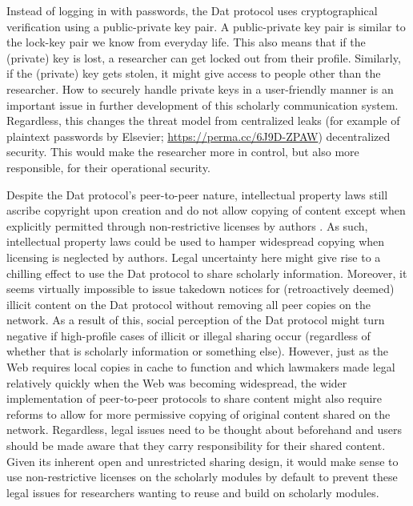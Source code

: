 \documentclass[publications,article,submit,moreauthors,pdftex,10pt,a4paper]{Definitions/mdpi}
\begin{document}
Instead of logging in with passwords, the Dat protocol uses
cryptographical verification using a public-private key pair. A
public-private key pair is similar to the lock-key pair we know from
everyday life. This also means that if the (private) key is lost, a
researcher can get locked out from their profile. Similarly, if the
(private) key gets stolen, it might give access to people other than
the researcher. How to securely handle private keys in a user-friendly
manner is an important issue in further development of this scholarly
communication system. Regardless, this changes the threat model from
centralized leaks (for example of plaintext passwords by Elsevier;
\url{https://perma.cc/6J9D-ZPAW}) decentralized security. This
would make the researcher more in control, but also more responsible,
for their operational security.

Despite the Dat protocol's peer-to-peer nature, intellectual property
laws still ascribe copyright upon creation and do not allow copying of
content except when explicitly permitted through non-restrictive
licenses by authors \citep{isbn:9781400851911}. As such, intellectual
property laws could be used to hamper widespread copying when
licensing is neglected by authors. Legal uncertainty here might give
rise to a chilling effect to use the Dat protocol to share scholarly
information. Moreover, it seems virtually impossible to issue takedown
notices for (retroactively deemed) illicit content on the Dat protocol
without removing all peer copies on the network. As a result of this,
social perception of the Dat protocol might turn negative if
high-profile cases of illicit or illegal sharing occur (regardless of
whether that is scholarly information or something else). However,
just as the Web requires local copies in cache to function and which
lawmakers made legal relatively quickly when the Web was becoming
widespread, the wider implementation of peer-to-peer protocols to
share content might also require reforms to allow for more permissive
copying of original content shared on the network.  Regardless, legal
issues need to be thought about beforehand and users should be made
aware that they carry responsibility for their shared content. Given
its inherent open and unrestricted sharing design, it would make sense
to use non-restrictive licenses on the scholarly modules by default to
prevent these legal issues for researchers wanting to reuse and build
on scholarly modules.
\end{document}
